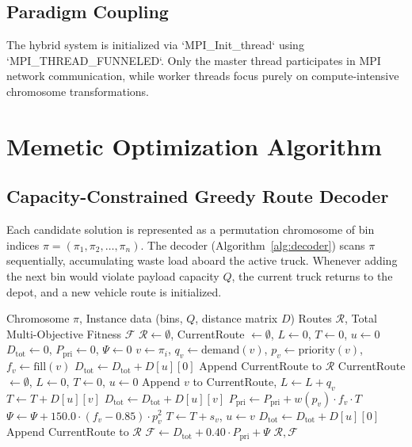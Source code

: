 \documentclass[conference]{IEEEtran}
\begin{document}
\subsection{Paradigm Coupling}
The hybrid system is initialized via `MPI_Init_thread` using `MPI_THREAD_FUNNELED`. Only the master thread participates in MPI network communication, while worker threads focus purely on compute-intensive chromosome transformations.

\section{Memetic Optimization Algorithm}

\subsection{Capacity-Constrained Greedy Route Decoder}
Each candidate solution is represented as a permutation chromosome of bin indices $\pi = (\pi_1, \pi_2, \dots, \pi_n)$. The decoder (Algorithm~\ref{alg:decoder}) scans $\pi$ sequentially, accumulating waste load aboard the active truck. Whenever adding the next bin would violate payload capacity $Q$, the current truck returns to the depot, and a new vehicle route is initialized.

\begin{algorithm}[htbp]
\caption{Greedy Route Decoder \& Fitness Evaluation}
\label{alg:decoder}
\begin{algorithmic}[1]
\REQUIRE Chromosome $\pi$, Instance data (bins, $Q$, distance matrix $D$)
\ENSURE Routes $\mathcal{R}$, Total Multi-Objective Fitness $\mathcal{F}$
\STATE $\mathcal{R} \leftarrow \emptyset$, CurrentRoute $\leftarrow \emptyset$, $L \leftarrow 0$, $T \leftarrow 0$, $u \leftarrow 0$
\STATE $D_{\text{tot}} \leftarrow 0$, $P_{\text{pri}} \leftarrow 0$, $\Psi \leftarrow 0$
    \STATE $v \leftarrow \pi_i$, $q_v \leftarrow \text{demand}(v)$, $p_v \leftarrow \text{priority}(v)$, $f_v \leftarrow \text{fill}(v)$
        \STATE $D_{\text{tot}} \leftarrow D_{\text{tot}} + D[u][0]$
        \STATE Append CurrentRoute to $\mathcal{R}$
        \STATE CurrentRoute $\leftarrow \emptyset$, $L \leftarrow 0$, $T \leftarrow 0$, $u \leftarrow 0$
    \ENDIF
    \STATE Append $v$ to CurrentRoute, $L \leftarrow L + q_v$
    \STATE $T \leftarrow T + D[u][v]$
    \STATE $D_{\text{tot}} \leftarrow D_{\text{tot}} + D[u][v]$
    \STATE $P_{\text{pri}} \leftarrow P_{\text{pri}} + w(p_v) \cdot f_v \cdot T$
        \STATE $\Psi \leftarrow \Psi + 150.0 \cdot (f_v - 0.85) \cdot p_v^2$
    \ENDIF
    \STATE $T \leftarrow T + s_v$, $u \leftarrow v$
\ENDFOR
{}
    \STATE $D_{\text{tot}} \leftarrow D_{\text{tot}} + D[u][0]$
    \STATE Append CurrentRoute to $\mathcal{R}$
\ENDIF
\STATE $\mathcal{F} \leftarrow D_{\text{tot}} + 0.40 \cdot P_{\text{pri}} + \Psi$
\RETURN $\mathcal{R}, \mathcal{F}$
\end{algorithmic}
\end{algorithm}
\end{document}
